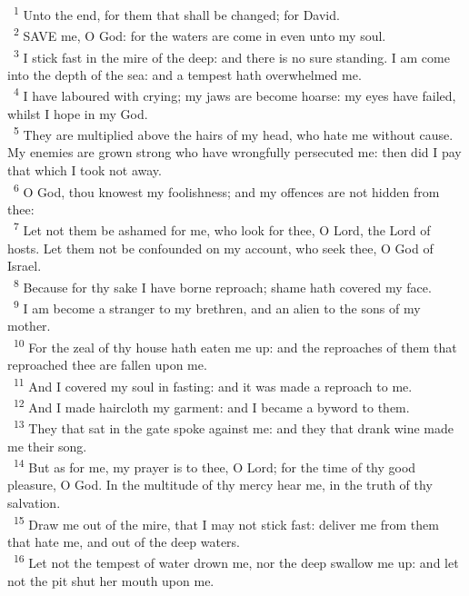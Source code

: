 \documentclass[a5paper,12pt]{article}
\begin{document}
\begin{multicols*}{2}
~\textsuperscript{1} Unto the end, for them that shall be changed; for David.\\
~\textsuperscript{2} SAVE me, O God: for the waters are come in even unto my soul.\\
~\textsuperscript{3} I stick fast in the mire of the deep: and there is no sure standing. I am come into the depth of the sea: and a tempest hath overwhelmed me.\\
~\textsuperscript{4} I have laboured with crying; my jaws are become hoarse: my eyes have failed, whilst I hope in my God.\\
~\textsuperscript{5} They are multiplied above the hairs of my head, who hate me without cause. My enemies are grown strong who have wrongfully persecuted me: then did I pay that which I took not away.\\
~\textsuperscript{6} O God, thou knowest my foolishness; and my offences are not hidden from thee:\\
~\textsuperscript{7} Let not them be ashamed for me, who look for thee, O Lord, the Lord of hosts. Let them not be confounded on my account, who seek thee, O God of Israel.\\
~\textsuperscript{8} Because for thy sake I have borne reproach; shame hath covered my face.\\
~\textsuperscript{9} I am become a stranger to my brethren, and an alien to the sons of my mother.\\
~\textsuperscript{10} For the zeal of thy house hath eaten me up: and the reproaches of them that reproached thee are fallen upon me.\\
~\textsuperscript{11} And I covered my soul in fasting: and it was made a reproach to me.\\
~\textsuperscript{12} And I made haircloth my garment: and I became a byword to them.\\
~\textsuperscript{13} They that sat in the gate spoke against me: and they that drank wine made me their song.\\
~\textsuperscript{14} But as for me, my prayer is to thee, O Lord; for the time of thy good pleasure, O God. In the multitude of thy mercy hear me, in the truth of thy salvation.\\
~\textsuperscript{15} Draw me out of the mire, that I may not stick fast: deliver me from them that hate me, and out of the deep waters.\\
~\textsuperscript{16} Let not the tempest of water drown me, nor the deep swallow me up: and let not the pit shut her mouth upon me.\\

\end{multicols*}
\end{document}
